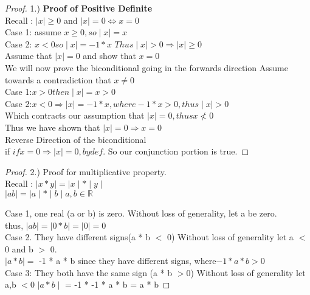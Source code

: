\documentclass[12pt]{article}
\theoremstyle{definition}
\begin{document}
\begin{proof}

  1.)\textbf{ Proof of Positive Definite} \\
Recall : $ \mid x \mid \ge 0$ and $ \mid x \mid= 0 \iff x = 0$\\

Case 1: assume $x \ge 0, so \mid x \mid = x $\\
Case 2: $x < 0 so \mid x \mid = -1 * x$ $ Thus \mid x \mid > 0 \Rightarrow \mid x \mid \ge 0$\\
Assume that $\mid x \mid = 0$ and show that $x = 0$\\
We will now prove the biconditional going in the forwards direction
Assume towards a contradiction that $x \ne 0$\\
Case 1:$ x > 0 then \mid x \mid = x > 0$\\
Case 2:$ x < 0 \Rightarrow \mid x \mid = -1 * x, where -1 * x > 0, thus \mid x \mid > 0$\\
Which contracts our assumption that $\mid x \mid = 0, thus x \nless 0$\\
Thus we have shown that $\mid x \mid = 0 \Rightarrow x = 0$\\
Reverse Direction of the biconditional \\
if $ if x = 0 \Rightarrow \mid x \mid = 0, by def.$
So our conjunction portion is true.

\end{proof}

\begin{proof}

2.) Proof for multiplicative property.\\
Recall : $\mid x * y \mid = \mid x \mid * \mid y \mid $\\
$\mid ab \mid = \mid a \mid * \mid b \mid a,b \in \mathbb{R}$

Case 1, one real (a or b) is zero. Without loss of generality, let a be zero.\\
thus, $\mid ab \mid = \mid 0 * b \mid = \mid 0 \mid = 0$\\
Case 2. They have different signs(a * b $<$ 0) Without loss of generality let a $<$ 0 and b $>$ 0.\\
$\mid a*b \mid =$ -1 * a * b since they have different signs, where$ -1 * a * b > 0$\\
Case 3: They both have the same sign (a * b $> 0$) Without loss of generality let a,b $< 0$
$\mid a * b \mid$ = -1 * -1 * a * b = a * b
\end{proof}
 
\end{document}
